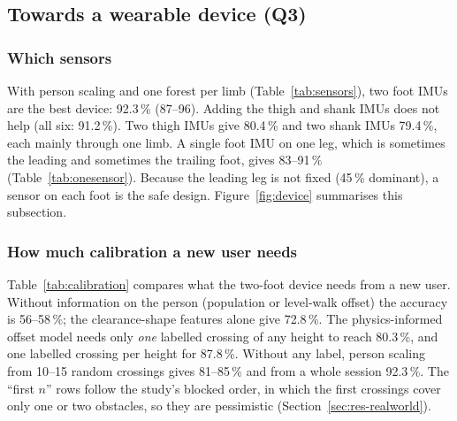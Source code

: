 \subsection{Towards a wearable device (Q3)}
\label{sec:res-device}

\subsubsection{Which sensors}

With person scaling and one forest per limb (Table~\ref{tab:sensors}), two foot IMUs are the best device: 92.3\,\% (87--96).
Adding the thigh and shank IMUs does not help (all six: 91.2\,\%). Two thigh IMUs give 80.4\,\% and two shank IMUs 79.4\,\%,
each mainly through one limb. A single foot IMU on one leg, which is sometimes the leading and sometimes the trailing foot,
gives 83--91\,\% (Table~\ref{tab:onesensor}). Because the leading leg is not fixed (45\,\% dominant), a sensor on each foot is
the safe design. Figure~\ref{fig:device} summarises this subsection.

\begin{table}[htbp]
\centering
\caption{Height accuracy by sensor site (person scaling, random forest; leading limb, trailing limb, soft vote of both).}
\label{tab:sensors}

\end{table}

\begin{table}[htbp]
\centering
\caption{One sensor on one leg only (it is the leading leg in some crossings and the trailing leg in others).}
\label{tab:onesensor}

\end{table}

\subsubsection{How much calibration a new user needs}

Table~\ref{tab:calibration} compares what the two-foot device needs from a new user. Without information on the person
(population or level-walk offset) the accuracy is 56--58\,\%; the clearance-shape features alone give 72.8\,\%. The
physics-informed offset model needs only \emph{one} labelled crossing of any height to reach 80.3\,\%, and one labelled crossing per
height for 87.8\,\%. Without any label, person scaling from 10--15 random crossings gives 81--85\,\% and from a whole session
92.3\,\%. The ``first $n$'' rows follow the study's blocked order, in which the first crossings cover only one or two obstacles,
so they are pessimistic (Section~\ref{sec:res-realworld}).

